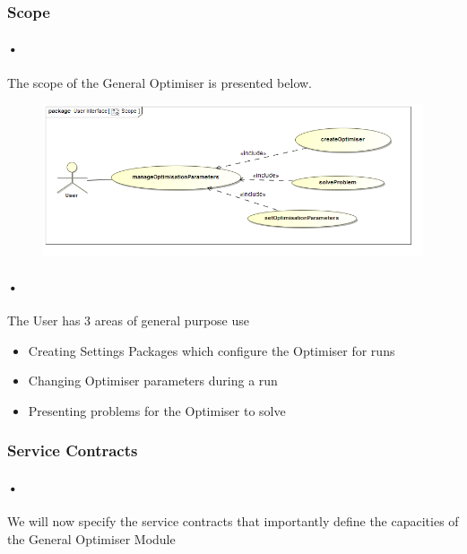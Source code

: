 \documentclass[11pt]{article}
\begin{document}
\subsubsection{Scope}
\paragraph{•}
The scope of the General Optimiser is presented below.
\begin{figure}[h]
\includegraphics[scale=0.45]{Scope.png}
\end{figure}

\paragraph{•}
The User has 3 areas of general purpose use
\begin{itemize}
\item Creating Settings Packages which configure the Optimiser for runs
\item Changing Optimiser parameters during a run
\item Presenting problems for the Optimiser to solve
\end{itemize}
\subsubsection{Service Contracts}
\paragraph{•}
We will now specify the service contracts that importantly define the capacities of the General Optimiser Module
\end{document}
